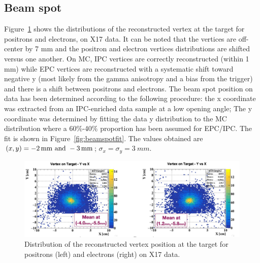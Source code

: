 \begin{refsection}
        \subsection{Beam spot}
        Figure~\ref{fig:beamspot1} shows the distributions of the reconstructed vertex at the target for positrons and electrons, on X17 data. 
        It can be noted that the vertices are off-center by 7 mm and the positron and electron vertices distributions are shifted versus one another.
        On MC, IPC vertices are correctly reconstructed (within 1 mm) while EPC vertices are reconstructed with a systematic shift toward negative y (most likely from the gamma anisotropy and a bias from the trigger) and there is a shift between positrons and electrons.
        The beam spot position on data has been determined according to the following procedure: the x coordinate was extracted from an IPC-enriched data sample at a low opening angle; The y coordinate was determined by fitting the data y distribution to the MC distribution where a 60$\%$-40$\%$ proportion has been assumed for EPC/IPC. The fit is shown in Figure~\ref{fig:beamspotfit}.
        The values obtained are $(x, y) = \SIlist{-2; -3}{mm}$; $\sigma_x= \sigma_y = \SI{3}{mm}$.

        \begin{figure}[]
            \centering
            \includegraphics[scale=0.5]{Figures/X17/Analysis/BeamSpotData.pdf}
            \caption{Distribution of the reconstructed vertex position at the target for positrons (left) and electrons (right) on X17 data.}
             \label{fig:beamspot1}
        \end{figure}
        

\end{refsection}
